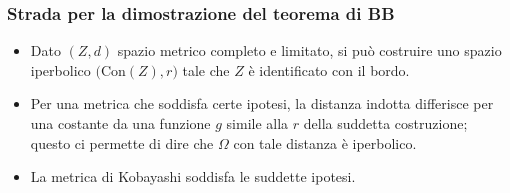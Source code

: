 \begin{frame}
  \frametitle{Strada per la dimostrazione del teorema di BB}
  \begin{itemize}
    \item Dato $(Z,d)$ spazio metrico completo e limitato, si può costruire uno spazio iperbolico $\big(\text{Con}(Z),r\big)$ tale che $Z$ è identificato con il bordo.
    \pause
    \item Per una metrica che soddisfa certe ipotesi, la distanza indotta differisce per una costante da una funzione $g$ simile alla $r$ della suddetta costruzione; questo ci permette di dire che $\Omega$ con tale distanza è iperbolico.
    \pause
    \item La metrica di Kobayashi soddisfa le suddette ipotesi.
  \end{itemize}
\end{frame}

